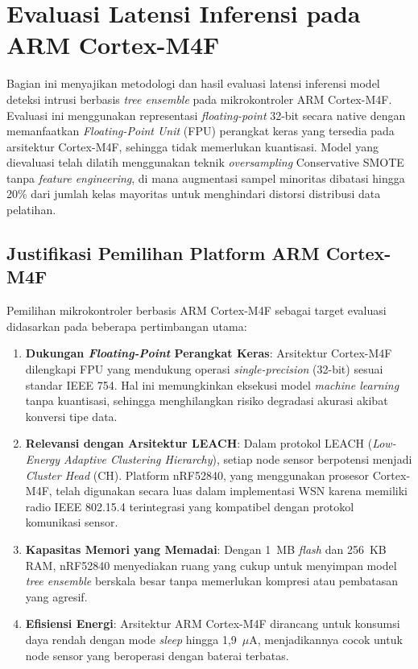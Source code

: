 
\section{Evaluasi Latensi Inferensi pada ARM Cortex-M4F}

Bagian ini menyajikan metodologi dan hasil evaluasi latensi inferensi model deteksi intrusi berbasis \textit{tree ensemble} pada mikrokontroler ARM Cortex-M4F. Evaluasi ini menggunakan representasi \textit{floating-point} 32-bit secara native dengan memanfaatkan \textit{Floating-Point Unit} (FPU) perangkat keras yang tersedia pada arsitektur Cortex-M4F, sehingga tidak memerlukan kuantisasi. Model yang dievaluasi telah dilatih menggunakan teknik \textit{oversampling} Conservative SMOTE tanpa \textit{feature engineering}, di mana augmentasi sampel minoritas dibatasi hingga 20\% dari jumlah kelas mayoritas untuk menghindari distorsi distribusi data pelatihan.

\subsection{Justifikasi Pemilihan Platform ARM Cortex-M4F}

Pemilihan mikrokontroler berbasis ARM Cortex-M4F sebagai target evaluasi didasarkan pada beberapa pertimbangan utama:

\begin{enumerate}
    \item \textbf{Dukungan \textit{Floating-Point} Perangkat Keras}: Arsitektur Cortex-M4F dilengkapi FPU yang mendukung operasi \textit{single-precision} (32-bit) sesuai standar IEEE 754. Hal ini memungkinkan eksekusi model \textit{machine learning} tanpa kuantisasi, sehingga menghilangkan risiko degradasi akurasi akibat konversi tipe data.

    \item \textbf{Relevansi dengan Arsitektur LEACH}: Dalam protokol LEACH (\textit{Low-Energy Adaptive Clustering Hierarchy}), setiap node sensor berpotensi menjadi \textit{Cluster Head} (CH). Platform nRF52840, yang menggunakan prosesor Cortex-M4F, telah digunakan secara luas dalam implementasi WSN karena memiliki radio IEEE 802.15.4 terintegrasi yang kompatibel dengan protokol komunikasi sensor.

    \item \textbf{Kapasitas Memori yang Memadai}: Dengan 1~MB \textit{flash} dan 256~KB RAM, nRF52840 menyediakan ruang yang cukup untuk menyimpan model \textit{tree ensemble} berskala besar tanpa memerlukan kompresi atau pembatasan yang agresif.

    \item \textbf{Efisiensi Energi}: Arsitektur ARM Cortex-M4F dirancang untuk konsumsi daya rendah dengan mode \textit{sleep} hingga 1,9~$\mu$A, menjadikannya cocok untuk node sensor yang beroperasi dengan baterai terbatas.
\end{enumerate}


